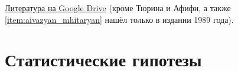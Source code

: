 \documentclass[a4paper,12pt]{report}
\begin{document}
    \href{https://drive.google.com/drive/folders/18WM37ML5G8PERAv0esU2HV9sqEgyejj0?usp=sharing}{Литература на Google Drive} (кроме Тюрина и Афифи, а также \ref{item:aivazyan_mhitaryan} нашёл только в издании 1989 года).

    \chapter{Статистические гипотезы}
    
    
\end{document}
